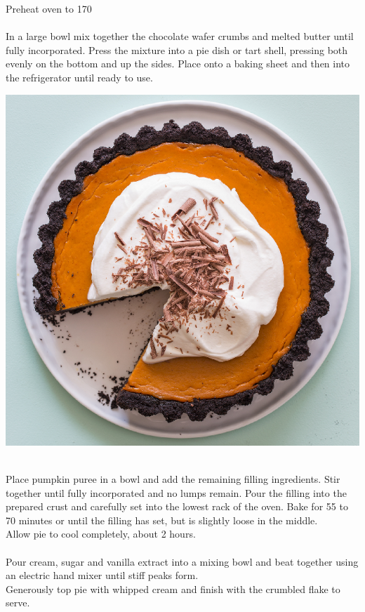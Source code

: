 \documentclass{tufte-book}
\begin{document}
\smallskip
Preheat oven to 170\celsius
\\ 
\\In a large bowl mix together the chocolate wafer crumbs and melted butter until fully incorporated. Press the mixture into a pie dish or tart shell, pressing both evenly on the bottom and up the sides. Place onto a baking sheet and then into the refrigerator until ready to use.
\begin{marginfigure}%
  \includegraphics[width=\linewidth]{pumpkinpiesquare.png}
\end{marginfigure}
\\Place pumpkin puree in a bowl and add the remaining filling ingredients. Stir together until fully incorporated and no lumps remain. Pour the filling into the prepared crust and carefully set into the lowest rack of the oven. Bake for 55 to 70 minutes or until the filling has set, but is slightly loose in the middle.
\\Allow pie to cool completely, about 2 hours.
\\ 
\\Pour cream, sugar and vanilla extract into a mixing bowl and beat together using an electric hand mixer until stiff peaks form.
\\Generously top pie with whipped cream and finish with the crumbled flake to serve.
\end{document}
